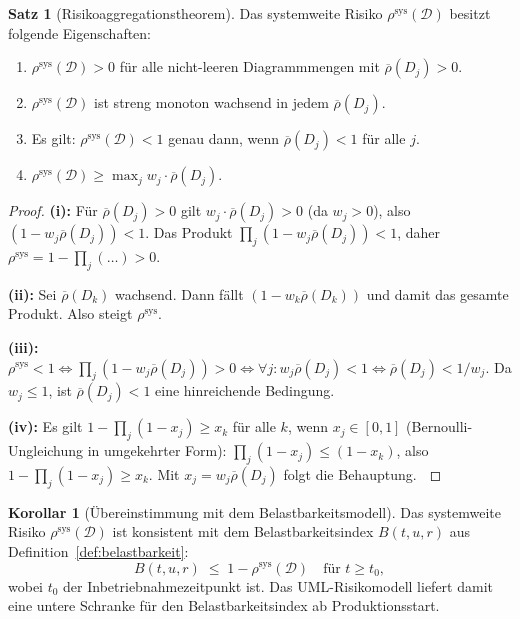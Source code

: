 ﻿\documentclass[a4paper,12pt]{article}
\theoremstyle{definition}
\newtheorem{satz}{Satz}
\newtheorem{korollar}{Korollar}
\newenvironment{beweis}{\begin{proof}}{\end{proof}}
\begin{document}
\begin{satz}[Risikoaggregationstheorem]
\label{satz:uml-aggregation}
    Das systemweite Risiko $\rho^{\mathrm{sys}}(\mathcal{D})$ besitzt folgende
    Eigenschaften:
    \begin{enumerate}[label=(\roman*)]
        \item $\rho^{\mathrm{sys}}(\mathcal{D}) > 0$ f\"ur alle nicht-leeren
              Diagrammmengen mit $\overline{\rho}(D_j) > 0$.
        \item $\rho^{\mathrm{sys}}(\mathcal{D})$ ist streng monoton wachsend in
              jedem $\overline{\rho}(D_j)$.
        \item Es gilt: $\rho^{\mathrm{sys}}(\mathcal{D}) < 1$ genau dann, wenn
              $\overline{\rho}(D_j) < 1$ f\"ur alle $j$.
        \item $\rho^{\mathrm{sys}}(\mathcal{D}) \geq \max_j w_j \cdot
              \overline{\rho}(D_j)$.
    \end{enumerate}
\end{satz}

\begin{beweis}
    \textbf{(i):} F\"ur $\overline{\rho}(D_j) > 0$ gilt
    $w_j \cdot \overline{\rho}(D_j) > 0$ (da $w_j > 0$), also
    $(1 - w_j\overline{\rho}(D_j)) < 1$. Das Produkt $\prod_j (1-w_j\overline{\rho}(D_j)) < 1$,
    daher $\rho^{\mathrm{sys}} = 1 - \prod_j(\ldots) > 0$.

    \textbf{(ii):} Sei $\overline{\rho}(D_k)$ wachsend. Dann f\"allt
    $(1 - w_k \overline{\rho}(D_k))$ und damit das gesamte Produkt. Also steigt
    $\rho^{\mathrm{sys}}$.

    \textbf{(iii):} $\rho^{\mathrm{sys}} < 1 \Leftrightarrow \prod_j(1-w_j\overline{\rho}(D_j)) > 0
    \Leftrightarrow \forall j\colon w_j\overline{\rho}(D_j) < 1
    \Leftrightarrow \overline{\rho}(D_j) < 1/w_j$. Da $w_j \leq 1$, ist
    $\overline{\rho}(D_j) < 1$ eine hinreichende Bedingung.

    \textbf{(iv):} Es gilt $1 - \prod_j(1-x_j) \geq x_k$ f\"ur alle $k$,
    wenn $x_j \in [0,1]$ (Bernoulli-Ungleichung in umgekehrter Form):
    $\prod_j(1-x_j) \leq (1-x_k)$, also $1 - \prod_j(1-x_j) \geq x_k$.
    Mit $x_j = w_j\overline{\rho}(D_j)$ folgt die Behauptung.
    $\qedhere$
\end{beweis}

\begin{korollar}[\"Ubereinstimmung mit dem Belastbarkeitsmodell]
\label{kor:uml-belastbarkeit}
    Das systemweite Risiko $\rho^{\mathrm{sys}}(\mathcal{D})$ ist konsistent mit
    dem Belastbarkeitsindex $B(t, u, r)$ aus Definition~\ref{def:belastbarkeit}:
    \[
        B(t, u, r) \;\leq\; 1 - \rho^{\mathrm{sys}}(\mathcal{D})
        \quad \text{f\"ur } t \geq t_0,
    \]
    wobei $t_0$ der Inbetriebnahmezeitpunkt ist. Das UML-Risikomodell liefert
    damit eine untere Schranke f\"ur den Belastbarkeitsindex ab Produktionsstart.
\end{korollar}
\end{document}
